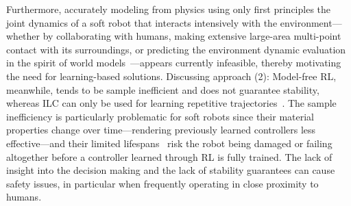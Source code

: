 Furthermore, accurately modeling from physics using only first principles the joint dynamics of a soft robot that interacts intensively with the environment—whether by collaborating with humans, making extensive large-area multi-point contact with its surroundings, or predicting the environment dynamic evaluation in the spirit of world models~\citep{ha2018world}—appears currently infeasible, thereby motivating the need for learning-based solutions.
Discussing approach (2): Model-free \gls{RL}, meanwhile, tends to be sample inefficient and does not guarantee stability, whereas \gls{ILC} can only be used for learning repetitive trajectories~\citep{bristow2006survey}. The sample inefficiency is particularly problematic for soft robots since their material properties change over time—rendering previously learned controllers less effective—and their limited lifespans~\citep{yasa2023overview} risk the robot being damaged or failing altogether before a controller learned through \gls{RL} is fully trained.
The lack of insight into the decision making and the lack of stability guarantees can cause safety issues, in particular when frequently operating in close proximity to humans.

